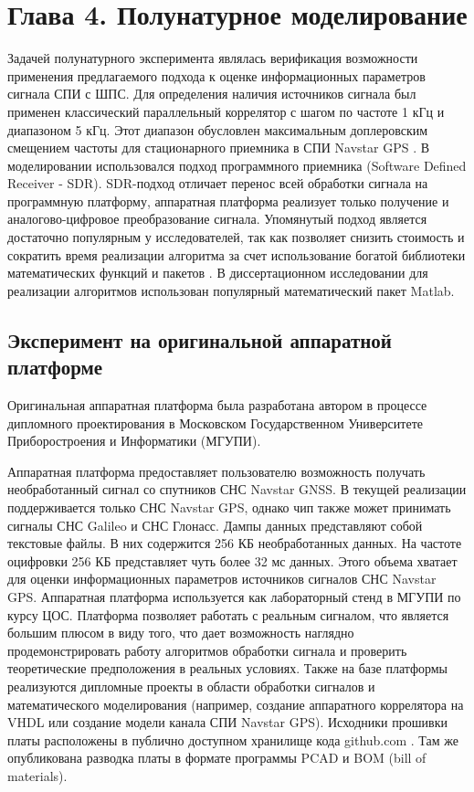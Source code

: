 \setcounter{chapter}{4}
\setcounter{section}{0}
\setcounter{equation}{0}
\setcounter{figure}{0}
\chapter*{Глава 4. Полунатурное моделирование}
\label{ss:hw}

Задачей полунатурного эксперимента являлась верификация возможности применения предлагаемого подхода к оценке информационных параметров сигнала СПИ с ШПС. Для определения наличия источников
сигнала был применен классический параллельный коррелятор \cite{tsui} с шагом по частоте 1 кГц и диапазоном 5 кГц. Этот диапазон обусловлен максимальным доплеровским
смещением частоты для стационарного приемника в СПИ Navstar GPS \cite{shahtarin_sync, tsui}. В моделировании использовался подход программного приемника
(Software Defined Receiver - SDR). SDR-подход отличает перенос всей обработки сигнала на программную платформу, аппаратная платформа реализует только
получение и аналогово-цифровое  преобразование сигнала. Упомянутый подход является достаточно популярным у исследователей, так как позволяет снизить стоимость и
сократить время реализации алгоритма за счет использование богатой библиотеки математических функций и пакетов \cite{grayver-book}.
В диссертационном исследовании для реализации алгоритмов использован популярный математический пакет Matlab.

\section{Эксперимент на оригинальной аппаратной платформе}
Оригинальная аппаратная платформа была разработана автором в процессе дипломного проектирования в Московском Государственном Университете Приборостроения и Информатики (МГУПИ).

Аппаратная платформа предоставляет пользователю возможность получать необработанный сигнал со спутников СНС Navstar GNSS. В текущей реализации поддерживается только 
СНС Navstar GPS, однако чип также может принимать сигналы СНС Galileo и СНС Глонасс. Дампы данных представляют собой текстовые файлы. В них содержится 256 КБ необработанных данных.
На частоте оцифровки 256 КБ представляет чуть более 32 мс данных. Этого объема хватает для оценки информационных параметров источников сигналов СНС Navstar GPS.
Аппаратная платформа используется как лабораторный стенд в МГУПИ по курсу ЦОС. Платформа позволяет работать с реальным сигналом, что является большим плюсом в
виду того, что дает возможность наглядно продемонстрировать работу алгоритмов обработки сигнала и проверить теоретические предположения в реальных условиях.
Также на базе платформы реализуются дипломные проекты в области обработки сигналов и математического моделирования
(например, создание аппаратного коррелятора на VHDL или создание модели канала СПИ Navstar GPS).
Исходники прошивки платы расположены в публично доступном хранилище кода github.com \cite{github-gpsproject}.
Там же опубликована разводка платы в формате программы PCAD и BOM (bill of materials).

